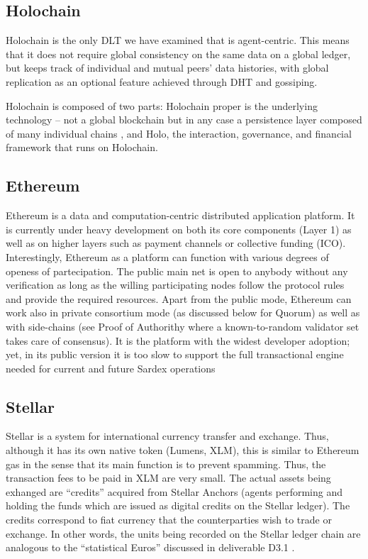 \subsection{Holochain}
Holochain is the only DLT we have examined that is agent-centric. This means that it does not require global consistency on the same data on a global ledger, but keeps track of individual and mutual peers' data histories, with global replication as an optional feature achieved through DHT and gossiping.

Holochain is composed of two parts: Holochain proper is the underlying technology -- not a global blockchain but in any case a persistence layer composed of many individual chains \cite{HarrisBrownEtAl2018}, and Holo, the interaction, governance, and financial framework that runs on Holochain.


\subsection{Ethereum}
Ethereum is a data and computation-centric distributed application platform. It is currently under heavy development on both its core components (Layer 1) as well as on higher layers such as payment channels or collective funding (ICO). Interestingly, Ethereum as a platform can function with various degrees of openess of partecipation. The public main net is open to anybody without any verification as long as the willing participating nodes follow the protocol rules and provide the required resources. Apart from the public mode, Ethereum can work also in private consortium mode (as discussed below for Quorum) as well as with side-chains (see Proof of Authorithy where a known-to-random validator set takes care of consensus). It is the platform with the widest developer adoption; yet, in its public version it is too slow to support the full transactional engine needed for current and future Sardex operations



\subsection{Stellar}
Stellar is a system for international currency transfer and exchange. Thus, although it has its own native token (Lumens, XLM), this is similar to Ethereum gas in the sense that its main function is to prevent spamming. Thus, the transaction fees to be paid in XLM are very small. The actual assets being exhanged are ``credits'' acquired from Stellar Anchors (agents performing and holding the funds which are issued as digital credits on the Stellar ledger). The credits correspond to fiat currency that the counterparties wish to trade or exchange. In other words, the units being recorded on the Stellar ledger chain are analogous to the ``statistical Euros'' discussed in  deliverable D3.1 \cite{INTERLACE_D31}.



